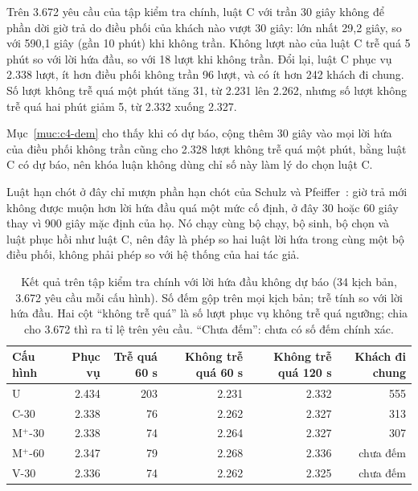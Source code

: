 Trên 3.672 yêu cầu của tập kiểm tra chính, luật C với trần 30 giây không để phần dời giờ trả do điều phối của khách
nào vượt 30 giây: lớn nhất 29,2 giây, so với 590,1 giây (gần 10 phút) khi không trần. Không lượt nào của luật C trễ
quá 5 phút so với lời hứa đầu, so với 18 lượt khi không trần. Đổi lại, luật C phục vụ 2.338 lượt, ít hơn điều phối
không trần 96 lượt, và có ít hơn 242 khách đi chung. Số lượt không trễ quá một phút tăng 31, từ 2.231 lên 2.262,
nhưng số lượt không trễ quá hai phút giảm 5, từ 2.332 xuống 2.327.

Mục~\ref{muc:c4-dem} cho thấy khi có dự báo, cộng thêm 30 giây vào mọi lời hứa của điều phối không trần cũng cho
2.328 lượt không trễ quá một phút, bằng luật C có dự báo, nên khóa luận không dùng chỉ số này làm lý do chọn luật C.

Luật hạn chót ở đây chỉ mượn phần hạn chót của Schulz và Pfeiffer~\cite{schulz2026}: giờ trả mới không được muộn hơn
lời hứa đầu quá một mức cố định, ở đây 30 hoặc 60 giây thay vì 900 giây mặc định của họ. Nó chạy cùng bộ chạy, bộ
sinh, bộ chọn và luật phục hồi như luật C, nên đây là phép so hai luật lời hứa trong cùng một bộ điều phối, không
phải phép so với hệ thống của hai tác giả.

\begin{table}[htbp]
\centering
\caption{Kết quả trên tập kiểm tra chính với lời hứa đầu không dự báo (34 kịch bản, 3.672 yêu cầu mỗi
cấu hình). Số đếm gộp trên mọi kịch bản; trễ tính so với lời hứa đầu. Hai cột ``không trễ quá'' là số lượt phục vụ
không trễ quá ngưỡng; chia cho 3.672 thì ra tỉ lệ trên yêu cầu. ``Chưa đếm'': chưa có số đếm chính xác.}
\label{bang:c4-chinh}
\small
\begin{tabular}{@{}lrrrrr@{}}
\toprule
\textbf{Cấu hình} & \textbf{Phục vụ} & \textbf{Trễ quá 60 s} & \textbf{Không trễ quá 60 s} &
\textbf{Không trễ quá 120 s} & \textbf{Khách đi chung}\\
\midrule
U & 2.434 & 203 & 2.231 & 2.332 & 555\\
C-30 & 2.338 & 76 & 2.262 & 2.327 & 313\\
M$^{+}$-30 & 2.338 & 74 & 2.264 & 2.327 & 307\\
M$^{+}$-60 & 2.347 & 79 & 2.268 & 2.336 & chưa đếm\\
V-30 & 2.336 & 74 & 2.262 & 2.325 & chưa đếm\\
\bottomrule
\end{tabular}
\end{table}

